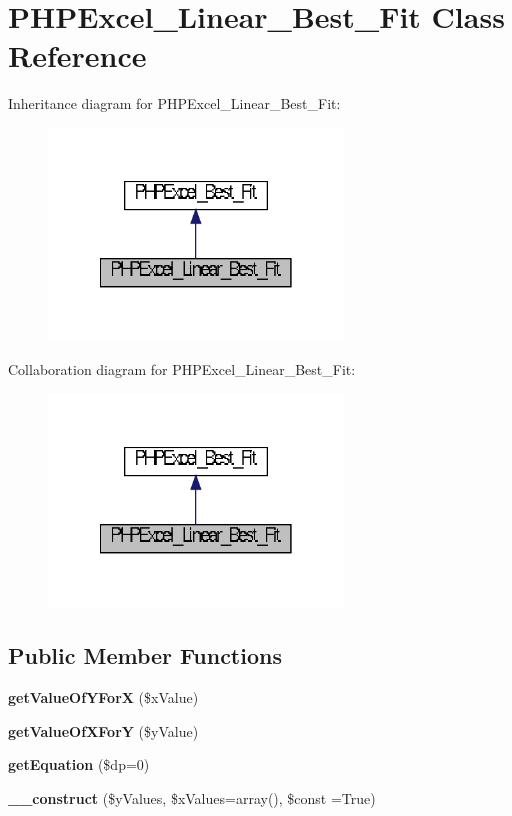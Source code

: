 \section{P\+H\+P\+Excel\+\_\+\+Linear\+\_\+\+Best\+\_\+\+Fit Class Reference}
\label{class_p_h_p_excel___linear___best___fit}


Inheritance diagram for P\+H\+P\+Excel\+\_\+\+Linear\+\_\+\+Best\+\_\+\+Fit\+:\nopagebreak
\begin{figure}[H]
\begin{center}
\leavevmode
\includegraphics[width=222pt]{class_p_h_p_excel___linear___best___fit__inherit__graph}
\end{center}
\end{figure}


Collaboration diagram for P\+H\+P\+Excel\+\_\+\+Linear\+\_\+\+Best\+\_\+\+Fit\+:\nopagebreak
\begin{figure}[H]
\begin{center}
\leavevmode
\includegraphics[width=222pt]{class_p_h_p_excel___linear___best___fit__coll__graph}
\end{center}
\end{figure}
\subsection*{Public Member Functions}
\begin{DoxyCompactItemize}
\item 
{\bf get\+Value\+Of\+Y\+For\+X} (\$x\+Value)
\item 
{\bf get\+Value\+Of\+X\+For\+Y} (\$y\+Value)
\item 
{\bf get\+Equation} (\$dp=0)
\item 
{\bf \+\_\+\+\_\+construct} (\$y\+Values, \$x\+Values=array(), \$const =True)
\end{DoxyCompactItemize}
